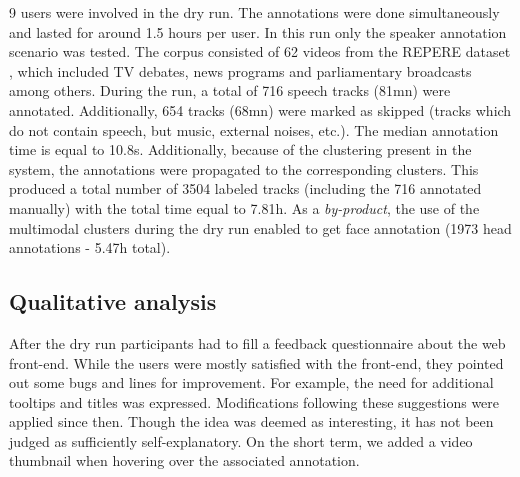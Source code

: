 \documentclass[a4paper]{article}
\begin{document}
9 users were involved in the dry run. The annotations were done simultaneously and lasted for around 1.5 hours per user.
In this run only the speaker annotation scenario was tested. The corpus consisted of 62 videos from the REPERE dataset \cite{giraudel2012repere}, which included TV debates, news programs and parliamentary broadcasts among others.  During the run, a total of 716 speech tracks (81mn) were annotated. Additionally, 654 tracks (68mn) were marked as skipped (tracks which do not contain speech, but music, external noises, etc.). The median annotation time is equal to 10.8s. Additionally, because of the clustering present in the system, the annotations were propagated to the corresponding clusters. This produced a total number of 3504 labeled tracks (including the 716 annotated manually) with the total time equal to 7.81h. As a \textit{by-product}, the use of the multimodal clusters during the dry run enabled to get face annotation (1973 head annotations - 5.47h total). 





 
    

  
        \vspace{-0.2cm}
     \subsection{Qualitative analysis}
        \vspace{-0.1cm}    


After the dry run participants had to fill a feedback questionnaire about the web front-end. 
While the users were mostly satisfied with the front-end, they pointed out some bugs and lines for improvement. For example, the need for additional tooltips and titles was expressed. Modifications following these suggestions were applied since then. Though the idea was deemed as interesting, it has not been judged as sufficiently self-explanatory. On the short term, we added a video thumbnail when hovering over the associated annotation.
\end{document}
